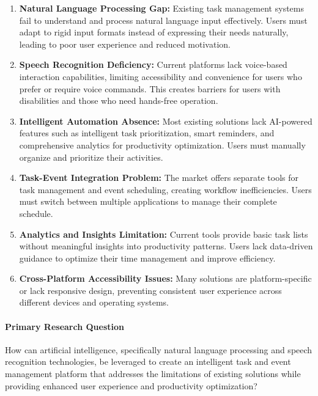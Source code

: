 \documentclass[12pt,a4paper]{article}
\begin{document}
\begin{enumerate}
    \item \textbf{Natural Language Processing Gap:} Existing task management systems fail to understand and process natural language input effectively. Users must adapt to rigid input formats instead of expressing their needs naturally, leading to poor user experience and reduced motivation.
    
    \item \textbf{Speech Recognition Deficiency:} Current platforms lack voice-based interaction capabilities, limiting accessibility and convenience for users who prefer or require voice commands. This creates barriers for users with disabilities and those who need hands-free operation.
    
    \item \textbf{Intelligent Automation Absence:} Most existing solutions lack AI-powered features such as intelligent task prioritization, smart reminders, and comprehensive analytics for productivity optimization. Users must manually organize and prioritize their activities.
    
    \item \textbf{Task-Event Integration Problem:} The market offers separate tools for task management and event scheduling, creating workflow inefficiencies. Users must switch between multiple applications to manage their complete schedule.
    
    \item \textbf{Analytics and Insights Limitation:} Current tools provide basic task lists without meaningful insights into productivity patterns. Users lack data-driven guidance to optimize their time management and improve efficiency.
    
    \item \textbf{Cross-Platform Accessibility Issues:} Many solutions are platform-specific or lack responsive design, preventing consistent user experience across different devices and operating systems.
\end{enumerate}

\paragraph{Primary Research Question}\mbox{}

How can artificial intelligence, specifically natural language processing and speech recognition technologies, be leveraged to create an intelligent task and event management platform that addresses the limitations of existing solutions while providing enhanced user experience and productivity optimization?
\end{document}
